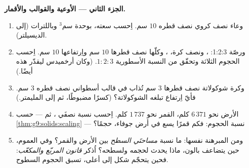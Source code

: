 \begin{problem}
\medskip
\noindent\textbf{الجزء الثاني --- الأوعية والقوالب والأقمار.}
\begin{enumerate}[resume]
  \item وعاء نصف كروي نصف قطره $10$ سم. اِحسب سعته،
        بوحدة سم$^3$ وباللترات (إلى الديسيلتر).
  \item ورصّة 1:2:3: ، ونصف كرة، ،
        وكلّها نصف قطرها $10$ سم واِرتفاعها $10$ سم. اِحسب
        الحجوم الثلاثة وتحقّق من النسبة الأسطورية
        $1 : 2 : 3$. (وكان أرخميدس ليقدّر هذه أيضًا.)
  \item وكرة شوكولاتة نصف قطرها $3$ سم تُذاب في قالب
        أسطواني نصف قطره $3$ سم. فأيّ اِرتفاع تبلغه
        الشوكولاتة؟ (كسرًا مضبوطًا، ثم إلى
        المليمتر.)
  \item {} الأرض نحو $6\,371$ كلم،  القمر نحو
        $1\,737$ كلم. اِحسب نسبة نصفَي ، ثم --- حسب
        \cref{thm:g9:solids:scaling} --- نسبة الحجوم: فكم
        قمرًا يسع في أرض جوفاء، حجمًا؟
  \item ومن المبرهنة نفسها: ما نسبة \emph{مساحتَي السطح} بين
        الأرض والقمر؟ وفي العموم، حين يتضاعف  بالون،
        ماذا يحدث لحجمه ولسطحه؟ اُذكر \emph{قانون المربّع
        والمكعّب}: فحين يتحجّم شكل إلى أعلى، تسبق الحجوم
        السطوح.
\end{enumerate}


\end{problem}
